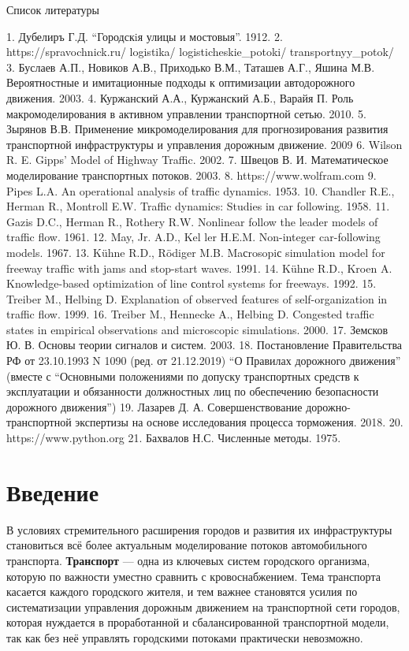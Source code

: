 \documentclass[12pt, a4paper]{extarticle}
\numberwithin{equation}{section}
\numberwithin{figure}{section}
\begin{document}
{\large \noindent Список литературы}

1. Дубелиръ Г.Д. ``Городскiя улицы и мостовыя''. 1912.
2. https://spravochnick.ru/ logistika/ logisticheskie\_potoki/ transportnyy\_potok/
3. Буслаев А.П., Новиков А.В., Приходько В.М., Таташев А.Г., Яшина М.В. Вероятностные и имитационные подходы к оптимизации автодорожного движения. 2003.
4. Куржанский А.А., Куржанский А.Б., Варайя П. Роль макромоделирования в активном управлении транспортной сетью. 2010.
5. Зырянов В.В. Применение микромоделирования для прогнозирования развития транспортной инфраструктуры и управления дорожным движение. 2009
6. Wilson R. E. Gipps’ Model of Highway Traffic. 2002.
7. Швецов В. И. Математическое моделирование транспортных потоков. 2003. 
8. https://www.wolfram.com
9. Pipes L.A. An operational analysis of traffic dynamics. 1953. 
10. Chandler R.E., Herman R., Montroll E.W. Traffic dynamics: Studies in car following. 1958.
11. Gazis D.C., Herman R., Rothery R.W. Nonlinear follow the leader models of traffic flow. 1961.
12. May, Jr. A.D., Kel ler H.E.M. Non-integer car-following models. 1967.
13. K\"{u}hne R.D., R\"{o}diger M.B. Maсrosopiс simulation model for freeway traffic with jams
and stop-start waves. 1991.
14. K\"{u}hne R.D., Kroen A. Knowledge-based optimization of line сontrol systems for freeways. 1992.
15. Treiber M., Helbing D. Explanation of observed features of self-organization in traffic flow.
1999.
16. Treiber M., Hennecke A., Helbing D. Congested traffic states in empirical observations and
microscopic simulations. 2000.
17. Земсков Ю. В. Основы теории сигналов и систем. 2003.
18. Постановление Правительства РФ от 23.10.1993 N 1090 (ред. от 21.12.2019) ``О Правилах дорожного движения'' (вместе с ``Основными положениями по допуску транспортных средств к эксплуатации и обязанности должностных лиц по обеспечению безопасности дорожного движения'')
19. Лазарев Д. А. Совершенствование дорожно-транспортной экспертизы на основе исследования процесса торможения. 2018.
20. https://www.python.org
21. Бахвалов Н.С.  Численные методы. 1975. 

\newpage

\section*{Введение}
В условиях стремительного расширения городов и развития их инфраструктуры становиться всё более актуальным моделирование потоков автомобильного транспорта. \textbf{Транспорт} --- одна из ключевых систем городского организма, которую по важности уместно сравнить с кровоснабжением. Тема транспорта касается каждого городского жителя, и тем важнее становятся усилия по систематизации управления дорожным движением на транспортной сети городов, которая нуждается в проработанной и сбалансированной транспортной модели, так как без неё управлять городскими потоками практически невозможно. 
\end{document}

